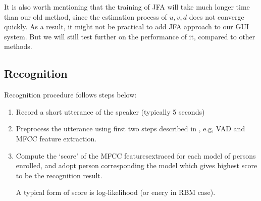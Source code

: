 \begin{enumerate}
          It is also worth mentioning that the training of JFA will take much longer time than our old method,
          since the estimation process of $ u, v, d$ does not converge quickly. As a result, it might not be practical to add
          JFA approach to our GUI system. But we will still test further on the performance of it, compared to other methods.
	\end{enumerate}

\subsection{Recognition}
	Recognition procedure follows steps below:
	\begin{enumerate}
		\item Record a short utterance of the speaker (typically 5 seconds)
		\item Preprocess the utterance using first two steps described in
			, e.g, VAD and MFCC feature extraction.
		\item Compute the `score' of the MFCC featuresextraced for each model of persons
			enrolled, and adopt person corresponding the model which gives highest score to be the
			recognition result.

			A typical form of score is log-likelihood (or enery in RBM case).

	\end{enumerate}

